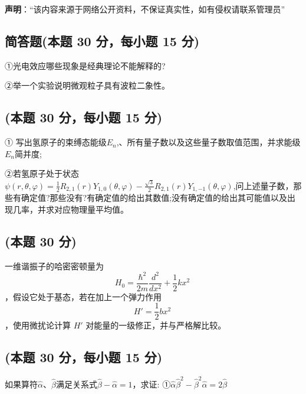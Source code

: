 
\textbf{声明}：“该内容来源于网络公开资料，不保证真实性，如有侵权请联系管理员”

\subsection{简答题(本题 30 分，每小题 15 分)}
①光电效应哪些现象是经典理论不能解释的?

②举一个实验说明微观粒子具有波粒二象性。

\subsection{(本题 30 分，每小题 15 分)}
① 写出氢原子的束缚态能级$E_n$,、所有量子数以及这些量子数取值范围，并求能级$E_n$简并度;

②若氢原子处于状态$\psi(r, \theta, \varphi) = \frac{1}{2} R_{2,1}(r) Y_{1,0}(\theta, \varphi) - \frac{\sqrt{3}}{2} R_{2,1}(r) Y_{1,-1}(\theta, \varphi)$,问上述量子数，那些有确定值?那些没有?有确定值的给出其数值;没有确定值的给出其可能值以及出现几率，并求对应物理量平均值。

\subsection{(本题 30 分)}
一维谐振子的哈密密顿量为 $$ H_0 = \frac{\hbar^2}{2m} \frac{d^2}{dx^2} + \frac{1}{2} k x^2~$$，假设它处于基态，若在加上一个弹力作用$$H' = \frac{1}{2} b x^2~$$，使用微扰论计算 $H'$ 对能量的一级修正，并与严格解比较。

\subsection{(本题 30 分，每小题 15 分)}
如果算符$\hat \alpha$、$\hat \beta$满足关系式$\hat \beta-\hat \alpha=1$，求证:
①$\hat \alpha\hat \beta^2-\hat \beta^2\hat \alpha=2\hat \beta$